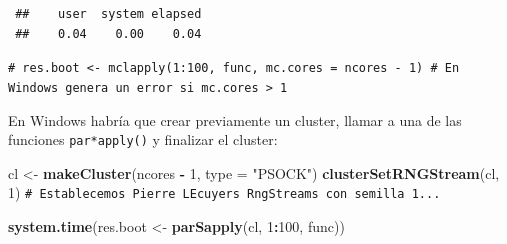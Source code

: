 \documentclass[
  spanish,
  10pt,
]{book}
\newenvironment{Shaded}{\begin{snugshade}}{\end{snugshade}}
\newcommand{\AttributeTok}[1]{\textcolor[rgb]{0.13,0.29,0.53}{#1}}
\newcommand{\CommentTok}[1]{\textcolor[rgb]{0.56,0.35,0.01}{\textit{#1}}}
\newcommand{\ConstantTok}[1]{\textcolor[rgb]{0.56,0.35,0.01}{#1}}
\newcommand{\ControlFlowTok}[1]{\textcolor[rgb]{0.13,0.29,0.53}{\textbf{#1}}}
\newcommand{\DecValTok}[1]{\textcolor[rgb]{0.00,0.00,0.81}{#1}}
\newcommand{\FunctionTok}[1]{\textcolor[rgb]{0.13,0.29,0.53}{\textbf{#1}}}
\newcommand{\NormalTok}[1]{#1}
\newcommand{\OtherTok}[1]{\textcolor[rgb]{0.56,0.35,0.01}{#1}}
\newcommand{\SpecialCharTok}[1]{\textcolor[rgb]{0.81,0.36,0.00}{\textbf{#1}}}
\newcommand{\StringTok}[1]{\textcolor[rgb]{0.31,0.60,0.02}{#1}}
\theoremstyle{break}
\theoremstyle{nonumberplain}
\renewcommand{\CommentTok}[1]{\textcolor[rgb]{0.41,0.41,0.41}{\texttt{#1}}}
\begin{document}
\begin{Shaded}
\end{Shaded}

\begin{verbatim}
 ##    user  system elapsed 
 ##    0.04    0.00    0.04
\end{verbatim}

\begin{Shaded}
\begin{Highlighting}[]
\CommentTok{\# res.boot \textless{}{-} mclapply(1:100, func, mc.cores = ncores {-} 1) \# En Windows genera un error si mc.cores \textgreater{} 1}
\end{Highlighting}
\end{Shaded}

En Windows habría que crear previamente un cluster, llamar a una de las funciones \texttt{par*apply()} y finalizar el cluster:

\begin{Shaded}
\begin{Highlighting}[]
\NormalTok{cl }\OtherTok{\textless{}{-}} \FunctionTok{makeCluster}\NormalTok{(ncores }\SpecialCharTok{{-}} \DecValTok{1}\NormalTok{, }\AttributeTok{type =} \StringTok{"PSOCK"}\NormalTok{)}
\FunctionTok{clusterSetRNGStream}\NormalTok{(cl, }\DecValTok{1}\NormalTok{) }\CommentTok{\# Establecemos Pierre L\textquotesingle{}Ecuyer\textquotesingle{}s RngStreams con semilla 1...}

\FunctionTok{system.time}\NormalTok{(res.boot }\OtherTok{\textless{}{-}} \FunctionTok{parSapply}\NormalTok{(cl, }\DecValTok{1}\SpecialCharTok{:}\DecValTok{100}\NormalTok{, func))}
\end{Highlighting}
\end{Shaded}
\end{document}

